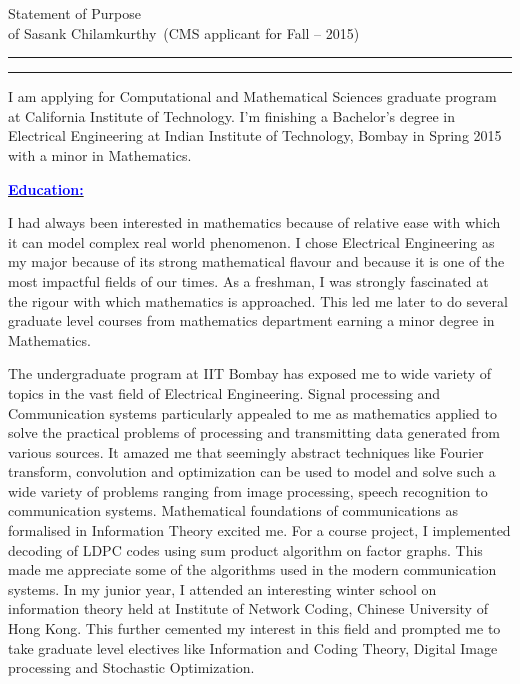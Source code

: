 \documentclass[11pt]{article}
\newcommand{\soptitle}{Statement of Purpose}
\newcommand{\yourname}{Sasank Chilamkurthy}
\newcommand{\statement}[1]{\par\medskip
  \underline{\textcolor{blue}{\textbf{#1:}}}\space
}
\begin{document}
\begin{center}
\LARGE\soptitle\\
\large of \yourname\ (CMS applicant for Fall -- 2015)
\end{center}

\hrule
\vspace{1pt}
\hrule height 1pt

\bigskip
I am applying for Computational and Mathematical Sciences graduate program at California Institute of Technology. 
I'm finishing a Bachelor's degree in Electrical Engineering at Indian Institute of Technology, Bombay in Spring 2015
with a minor in Mathematics.
\statement{Education}
I had always been interested in mathematics because of relative ease with which it can model complex real world phenomenon. 
I chose Electrical Engineering as my major because of its strong mathematical flavour and because it is one of the most impactful fields of our times. 
As a freshman, I was strongly fascinated at the rigour with which mathematics is approached. 
This led me later to do several graduate level courses from mathematics department earning a minor degree in Mathematics. 

The undergraduate program at IIT Bombay has exposed me to wide variety of topics in the vast field of Electrical Engineering. 
Signal processing and Communication systems particularly appealed to me as mathematics applied to solve the practical problems of processing and transmitting data generated from various sources. 
It amazed me that seemingly abstract techniques like Fourier transform, convolution and optimization can be used to model and solve such a wide variety of problems ranging from image processing, speech recognition to communication systems.
Mathematical foundations of communications as formalised in Information Theory excited me. 
For a course project, I implemented decoding of LDPC codes using sum product algorithm on factor graphs. 
This made me appreciate some of the algorithms used in the modern communication systems. 
In my junior year, I attended an interesting winter school on information theory held at Institute of Network Coding, Chinese University of Hong Kong. 
This further cemented my interest in this field and prompted me to take graduate level electives like Information and Coding Theory, Digital Image processing and Stochastic Optimization.
\end{document}
